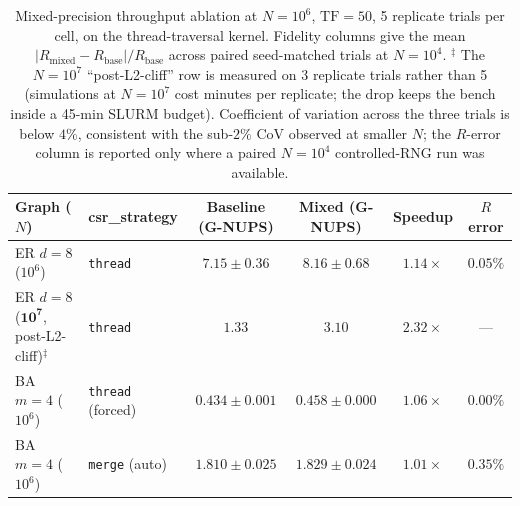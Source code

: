 \begin{table}[H]
\caption{Mixed-precision throughput ablation at $N{=}10^6$, $\mathrm{TF}{=}50$, 5 replicate trials per cell, on the thread-traversal kernel. Fidelity columns give the mean $|R_\text{mixed} - R_\text{base}| / R_\text{base}$ across paired seed-matched trials at $N{=}10^4$. $^\ddagger$ The $N{=}10^7$ ``post-L2-cliff'' row is measured on 3 replicate trials rather than 5 (simulations at $N{=}10^7$ cost minutes per replicate; the drop keeps the bench inside a 45-min SLURM budget). Coefficient of variation across the three trials is below $4\%$, consistent with the sub-$2\%$ CoV observed at smaller $N$; the $R$-error column is reported only where a paired $N{=}10^4$ controlled-RNG run was available.}
\label{tab:mixed_precision_summary}
%
\centering
\begin{tabular*}{\linewidth}{@{\extracolsep{\fill}}llcccc@{}}
\toprule
\textbf{Graph ($N$)} & \textbf{csr\_strategy} & \textbf{Baseline (G-NUPS)} & \textbf{Mixed (G-NUPS)} & \textbf{Speedup} & \textbf{$R$ error} \\
\midrule
ER $d{=}8$ ($10^6$)  & \texttt{thread}          & $7.15 \pm 0.36$ & $8.16 \pm 0.68$ & $1.14\times$ & $0.05\%$ \\
ER $d{=}8$ ($\mathbf{10^7}$, post-L2-cliff)$^\ddagger$ & \texttt{thread} & $1.33$ & $3.10$ & $\mathbf{2.32\times}$ & --- \\
BA $m{=}4$ ($10^6$)  & \texttt{thread} (forced) & $0.434 \pm 0.001$ & $0.458 \pm 0.000$ & $1.06\times$ & $0.00\%$ \\
BA $m{=}4$ ($10^6$)  & \texttt{merge} (auto)    & $1.810 \pm 0.025$ & $1.829 \pm 0.024$ & $1.01\times$ & $0.35\%$ \\
\bottomrule
\end{tabular*}
\end{table}

